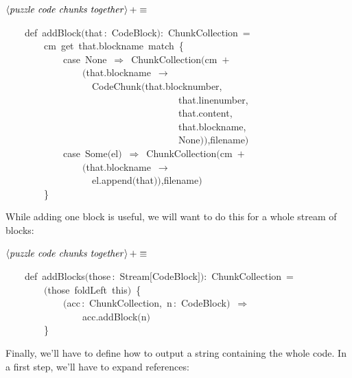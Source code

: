 \documentclass[a4paper,12pt]{article}
\begin{document}
$\left<\mbox{\emph{puzzle code chunks together}}\right>+\equiv$
\begin{program}~~~~{\vem def}~addBlock$($that\,{\rm :}~CodeBlock$)${\rm :}~ChunkCollection~=
\\~~~~~~~~cm~get~that.blockname~{\vem match}~{\small\{}
\\~~~~~~~~~~~~{\vem case}~None~$\Rightarrow$~ChunkCollection$($cm~$+$
\\~~~~~~~~~~~~~~~~$($that.blockname~$\rightarrow$
\\~~~~~~~~~~~~~~~~~~CodeChunk$($that.blocknumber,
\\~~~~~~~~~~~~~~~~~~~~~~~~~~~~~~~~~~~~that.linenumber,
\\~~~~~~~~~~~~~~~~~~~~~~~~~~~~~~~~~~~~that.content,
\\~~~~~~~~~~~~~~~~~~~~~~~~~~~~~~~~~~~~that.blockname,
\\~~~~~~~~~~~~~~~~~~~~~~~~~~~~~~~~~~~~None$)$$)$,filename$)$
\\~~~~~~~~~~~~{\vem case}~Some$($el$)$~$\Rightarrow$~ChunkCollection$($cm~$+$
\\~~~~~~~~~~~~~~~~$($that.blockname~$\rightarrow$
\\~~~~~~~~~~~~~~~~~~el.append$($that$)$$)$,filename$)$
\\~~~~~~~~{\small\}}
\\[0.5em]\end{program}
While adding one block is useful, we will want to do this
for a whole stream of blocks:

$\left<\mbox{\emph{puzzle code chunks together}}\right>+\equiv$
\begin{program}~~~~{\vem def}~addBlocks$($those\,{\rm :}~Stream$[$CodeBlock$]$$)${\rm :}~ChunkCollection~=
\\~~~~~~~~$($those~foldLeft~{\vem this}$)$~{\small\{}
\\~~~~~~~~~~~~$($acc\,{\rm :}~ChunkCollection,~n\,{\rm :}~CodeBlock$)$~$\Rightarrow$
\\~~~~~~~~~~~~~~~~acc.addBlock$($n$)$
\\~~~~~~~~{\small\}}
\\[0.5em]\end{program}
Finally, we'll have to define how to output a string containing the
whole code. In a first step, we'll have to expand references:
\end{document}
